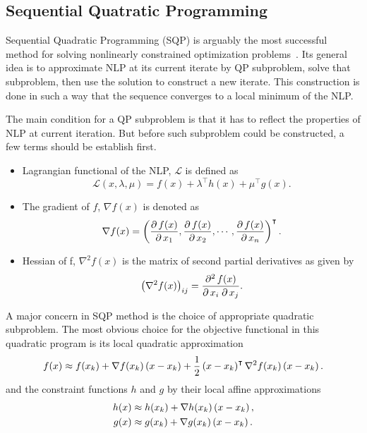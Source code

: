 \subsection{Sequential Quatratic Programming}\label{SQP:theory}
Sequential Quadratic Programming (SQP) is arguably the most successful method for solving nonlinearly constrained optimization problems~\cite{SQP:Theory}. Its general idea is to approximate NLP at its current iterate by QP subproblem, solve that subproblem, then use the solution to construct a new iterate. This construction is done in such a way that the sequence converges to a local minimum of the NLP.

The main condition for a QP subproblem is that it has to reflect the properties of NLP at current iteration. But before such subproblem could be constructed, a few terms should be establish first.
\begin{itemize}
	\item Lagrangian functional of the NLP, $\mathcal{L}$ is defined as\begin{equation}
		\mathcal{L}(x,\lambda,\mu) = f(x) + \lambda^\intercal h(x) + \mu^\intercal g(x). 
	\end{equation}
	\item The gradient of $f$, $\nabla f(x)$ is denoted as
	\begin{equation}
		\nabla f(x) = \left( \frac{\partial\, f(x)}{\partial\, x_1},\frac{\partial\, f(x)}{\partial\, x_2},\cdots,\frac{\partial\, f(x)}{\partial\, x_n} \right)^\intercal.
	\end{equation}
	\item Hessian of f, $\nabla^2f(x)$ is the matrix of second partial derivatives as given by
	\begin{equation}
		\left( \nabla^2f(x) \right)_{ij} = \frac{\partial^2\, f(x)}{\partial\, x_i\; \partial\, x_j}.
	\end{equation}
\end{itemize}
A major concern in SQP method is the choice of appropriate quadratic subproblem. 
The most obvious choice for the objective functional in this quadratic program is its local quadratic approximation
\begin{equation}
f(x)\approx f(x_k)+\nabla f(x_k)\left( x-x_k \right)+\frac{1}{2}\left( x-x_k \right)^\intercal \nabla^2f(x_k)\left( x-x_k \right).
\end{equation}
and the constraint functions $h$ and $g$ by their local affine approximations
\begin{subequations}
	\begin{align}
		h(x)&\approx h(x_k)+\nabla h(x_k)\left( x-x_k \right),\\
		g(x)&\approx g(x_k)+\nabla g(x_k)\left( x-x_k \right).	
	\end{align}
\end{subequations}
